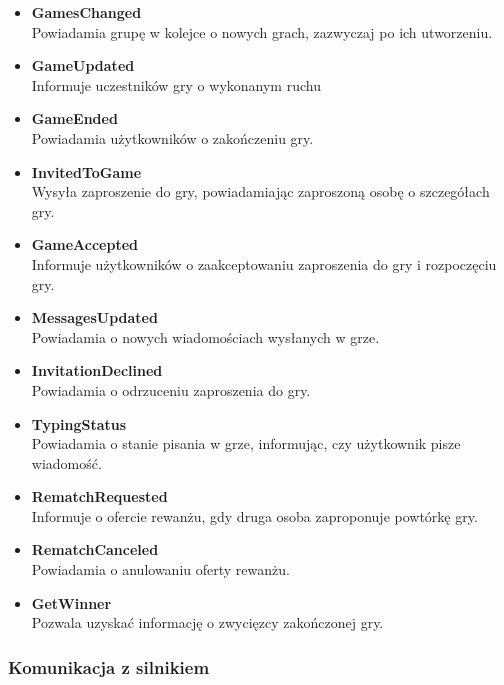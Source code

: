 \documentclass[twoside]{projektInzynierskiMS1}
\begin{document}
\begin{itemize}
    \item \textbf{GamesChanged} \\
    Powiadamia grupę w kolejce o nowych grach, zazwyczaj po ich utworzeniu.
    \item \textbf{GameUpdated} \\
    Informuje uczestników gry o wykonanym ruchu
    \item \textbf{GameEnded} \\
    Powiadamia użytkowników o zakończeniu gry.
    \item \textbf{InvitedToGame} \\
    Wysyła zaproszenie do gry, powiadamiając zaproszoną osobę o szczegółach gry.
    \item \textbf{GameAccepted} \\
    Informuje użytkowników o zaakceptowaniu zaproszenia do gry i rozpoczęciu gry.
    \item \textbf{MessagesUpdated} \\
    Powiadamia o nowych wiadomościach wysłanych w grze.
    \item \textbf{InvitationDeclined} \\
    Powiadamia o odrzuceniu zaproszenia do gry.
    \item \textbf{TypingStatus} \\
    Powiadamia o stanie pisania w grze, informując, czy użytkownik pisze wiadomość.
    \item \textbf{RematchRequested} \\
    Informuje o ofercie rewanżu, gdy druga osoba zaproponuje powtórkę gry.
    \item \textbf{RematchCanceled} \\
    Powiadamia o anulowaniu oferty rewanżu.
    \item \textbf{GetWinner} \\
    Pozwala uzyskać informację o zwycięzcy zakończonej gry.
\end{itemize}

\newpage

\subsubsection{Komunikacja z silnikiem}
\end{document}
